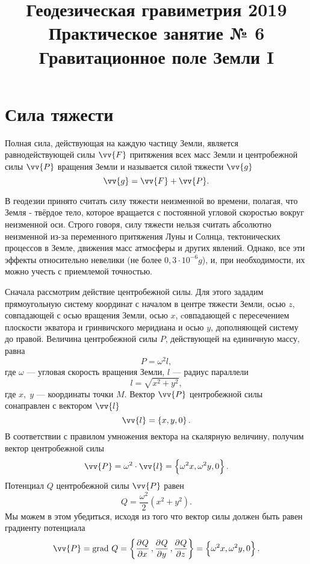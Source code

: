 \documentclass[11pt, a4paper]{article}
\title{{\Large Геодезическая гравиметрия 2019}\\ 
    {\bf\Large Практическое занятие № 6} \\
{\Large Гравитационное поле Земли I}}
\author{}
\date{\DTMusedate{lessondate}}
\theoremstyle{plain}
\theoremstyle{definition}
\theoremstyle{remark}
\begin{document}
\maketitle
\section{Сила тяжести}
Полная сила, действующая на каждую частицу Земли, является равнодействующей силы $\vv{F}$ притяжения всех масс Земли и центробежной силы $\vv{P}$ вращения Земли и называется силой тяжести $\vv{g}$
\begin{equation*}
    \vv{g} = \vv{F} + \vv{P}.
\end{equation*}

В геодезии принято считать силу тяжести неизменной во времени, полагая, что Земля - твёрдое тело, которое вращается с постоянной угловой скоростью вокруг неизменной оси. Строго говоря, силу тяжести нельзя считать абсолютно неизменной из-за переменного притяжения Луны и Солнца, тектонических процессов в Земле, движения масс атмосферы и других явлений. Однако, все эти эффекты относительно невелики (не более $0,3 \cdot 10^{-6} g$), и, при необходимости, их можно учесть с приемлемой точностью.

Сначала рассмотрим действие центробежной силы. Для этого зададим прямоугольную систему координат с началом в центре тяжести Земли, осью $z$, совпадающей с осью вращения Земли, осью $x$, cовпадающей с пересечением плоскости экватора и гринвичского меридиана и осью $y$,  дополняющей систему до правой. Величина центробежной силы $P$, действующей на единичную массу, равна
\begin{equation*}
    P = \omega^2 l,
\end{equation*}
где $\omega$ --- угловая скорость вращения Земли, $l$ --- радиус параллели
\begin{equation*}
	l = \sqrt{x^2 + y^2},
\end{equation*}
где $x,\; y$ --- координаты точки $M$.
Вектор $\vv{P}$ центробежной силы  сонаправлен с вектором $\vv{l}$
\begin{equation*}
	\vv{l} = \left\lbrace x, y, 0\right\rbrace.
\end{equation*}
В соответствии с правилом умножения вектора на скалярную величину, получим вектор центробежной силы
\begin{equation*}
	\vv{P} = \omega^2 \cdot \vv{l} = \left\lbrace \omega^2 x, \omega^2 y, 0\right\rbrace.
\end{equation*}
Потенциал $Q$ центробежной силы $\vv{P}$ равен
\begin{equation*}
	Q = \dfrac{\omega^2}{2} \left(x^2+y^2\right).
\end{equation*}
Мы можем в этом убедиться, исходя из того что вектор силы должен быть равен градиенту потенциала
\begin{equation*}
    \vv{P} = \text{grad } Q = \left\lbrace \dpd{Q}{x}, \dpd{Q}{y}, \dpd{Q}{z} \right\rbrace = \left\lbrace \omega^2 x, \omega^2 y, 0\right\rbrace.
\end{equation*}
\end{document}
